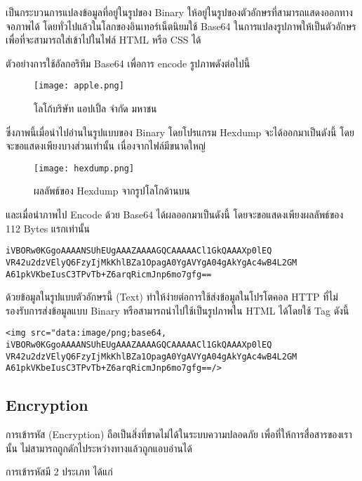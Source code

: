 เป็นกระบวนการแปลงข้อมูลที่อยู่ในรูปของ Binary ให้อยู่ในรูปของตัวอักษรที่สามารถแสดงออกทางจอภาพได้ โดยทั่วไปแล้วในโลกของอินเทอร์เน็ตนิยมใช้ Base64 ในการแปลงรูปภาพให้เป็นตัวอักษรเพื่อที่จะสามารถใส่เข้าไปในไฟล์ HTML หรือ CSS ได้

ตัวอย่างการใช้อัลกอริทึม Base64 เพื่อการ encode รูปภาพดังต่อไปนี้

\begin{figure}[h]
	\centering
	\texttt{[image: apple.png]}
	\caption{โลโก้บริษัท แอปเปิ้ล จำกัด มหาชน}
	\label{Fig:apple.logo}
\end{figure}

ซึ่งภาพนี้เมื่อนำไปอ่านในรูปแบบของ Binary โดยโปรแกรม Hexdump \cite{???} จะได้ออกมาเป็นดังนี้ โดยจะขอแสดงเพียงบางส่วนเท่านั้น เนื่องจากไฟล์มีขนาดใหญ่

\begin{figure}[h]
	\centering
	\texttt{[image: hexdump.png]}
	\caption{ผลลัพธ์ของ Hexdump จากรูปโลโกด้านบน}
	\label{Fig:apple.logo.hex}
\end{figure}

และเมื่อนำภาพไป Encode ด้วย Base64 ได้ผลออกมาเป็นดังนี้ โดยจะขอแสดงเพียงผลลัพธ์ของ 112 Bytes แรกเท่านั้น

\begin{lstlisting}[numbers=none]
iVBORw0KGgoAAAANSUhEUgAAAZAAAAGQCAAAAACl1GkQAAAXp0lEQ
VR42u2dzVElyQ6FzyIjMkKhlBZa1OpagA0YgAVYgA04gAkYgAc4wB4L2GM
A61pkVKbeIusC3TPvTb+Z6arqRicmJnp6mo7gfg==
\end{lstlisting}

ด้วยข้อมูลในรูปแบบตัวอักษรนี้ (Text) ทำให้ง่ายต่อการใช้ส่งข้อมูลในโปรโตคอล HTTP ที่ไม่รองรับการส่งข้อมูลแบบ Binary หรือสามารถนำไปใช้เป็นรูปภาพใน HTML ได้โดยใช้ Tag ดังนี้

\begin{lstlisting}[numbers=none]
<img src="data:image/png;base64, iVBORw0KGgoAAAANSUhEUgAAAZAAAAGQCAAAAACl1GkQAAAXp0lEQ VR42u2dzVElyQ6FzyIjMkKhlBZa1OpagA0YgAVYgA04gAkYgAc4wB4L2GM A61pkVKbeIusC3TPvTb+Z6arqRicmJnp6mo7gfg==/>
\end{lstlisting}

\subsection{Encryption}

การเข้ารหัส (Encryption) ถือเป็นสิ่งที่ขาดไม่ได้ในระบบความปลอดภัย เพื่อที่ให้การสื่อสารของเรานั้น ไม่สามารถถูกดักไประหว่างทางแล้วถูกแอบอ่านได้

การเข้ารหัสมี 2 ประเภท ได้แก่

